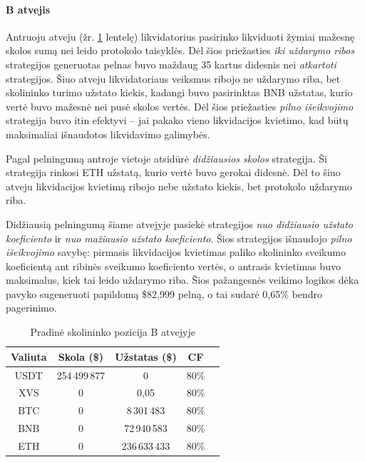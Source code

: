 \documentclass[]{VUMIFTemplateClass}
\begin{document}
\paragraph{B atvejis} Antruoju atveju (žr. \ref{case_b} lentelę) likvidatorius pasirinko likviduoti žymiai mažesnę skolos sumą nei leido protokolo taisyklės. Dėl šios priežasties \textit{iki uždarymo ribos} strategijos generuotas pelnas buvo maždaug 35 kartus didesnis nei \textit{atkartoti} strategijos. Šiuo atveju likvidatoriaus veiksmus ribojo ne uždarymo riba, bet skolininko turimo užstato kiekis, kadangi buvo pasirinktas BNB užstatas, kurio vertė buvo mažesnė nei pusė skolos vertės. Dėl šios priežasties \textit{pilno išeikvojimo} strategija buvo itin efektyvi – jai pakako vieno likvidacijos kvietimo, kad būtų maksimaliai išnaudotos likvidavimo galimybės.

Pagal pelningumą antroje vietoje atsidūrė \textit{didžiausios skolos} strategija. Ši strategija rinkosi ETH užstatą, kurio vertė buvo gerokai didesnė. Dėl to šiuo atveju likvidacijos kvietimą ribojo nebe užstato kiekis, bet protokolo uždarymo riba.

Didžiausią pelningumą šiame atvejyje pasiekė strategijos \textit{nuo didžiausio užstato koeficiento} ir \textit{nuo mažiausio užstato koeficiento}. Šios strategijos išnaudojo \textit{pilno išeikvojimo} savybę: pirmasis likvidacijos kvietimas paliko skolininko sveikumo koeficientą ant ribinės sveikumo koeficiento vertės, o antrasis kvietimas buvo maksimalus, kiek tai leido uždarymo riba. Šios pažangesnės veikimo logikos dėka pavyko sugeneruoti papildomą \$82,999 pelną, o tai sudarė 0,65\% bendro pagerinimo.

\begin{table}[H]
\centering
\caption{Pradinė skolininko pozicija B atvejyje}
\label{case_b}
\begin{tabular}{|c|c|c|c|c|}
\hline
\textbf{Valiuta} & \textbf{Skola (\$)} & \textbf{Užstatas (\$)} & \textbf{CF} \\ \hline
USDT &  254\,499\,877 &  0             & 80\%  \\ \hline
XVS  &  0             &  0,05          & 80\%  \\ \hline
BTC  &  0             &  8\,301\,483   & 80\%  \\ \hline
BNB  &  0             &  72\,940\,583  & 80\%  \\ \hline
ETH  &  0             &  236\,633\,433 & 80\%  \\ \hline
\end{tabular}
\end{table}
\end{document}
